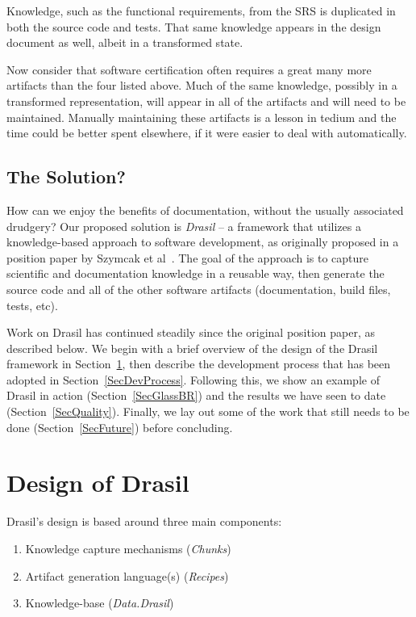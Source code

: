 \documentclass[sigconf]{acmart}
\begin{document}
Knowledge, such as the functional requirements, from the SRS is duplicated in 
both the source code and tests. That same knowledge appears in the design 
document as well, albeit in a transformed state. 

Now consider that software certification often requires a great many more 
artifacts than the four listed above. Much of the same knowledge, possibly in a
transformed representation, will appear in 
all of the artifacts and will need to be maintained. Manually maintaining these 
artifacts is a lesson in tedium and the time could be better spent elsewhere, if 
it were easier to deal with automatically.

\subsection*{The Solution?}

How can we enjoy the benefits of documentation, without the usually associated
drudgery?  Our proposed solution is \textit{Drasil} -- a framework that utilizes
a knowledge-based approach to software development, as originally proposed in a
position paper by Szymcak et al~\cite{SzymczakEtAl2016}. The goal of the
approach is to capture scientific and documentation knowledge in a reusable way,
then generate the source code and all of the other software artifacts
(documentation, build files, tests, etc).

Work on Drasil has continued steadily since the original position paper, as
described below. We begin with a brief overview of the design of the Drasil
framework in Section~\ref{SecDesign}, then describe the development process that
has been adopted in Section~\ref{SecDevProcess}. Following this, we show an example of
Drasil in action (Section~\ref{SecGlassBR}) and the results we have seen to date
(Section~\ref{SecQuality}). Finally, we lay out some of the work that still
needs to be done (Section~\ref{SecFuture}) before concluding.

\section{Design of Drasil} \label{SecDesign}

Drasil's design is based around three main components:
\begin{enumerate}
	\item Knowledge capture mechanisms (\textit{Chunks})
	\item Artifact generation language(s) (\textit{Recipes})
	\item Knowledge-base (\textit{Data.Drasil})
\end{enumerate}
\end{document}
